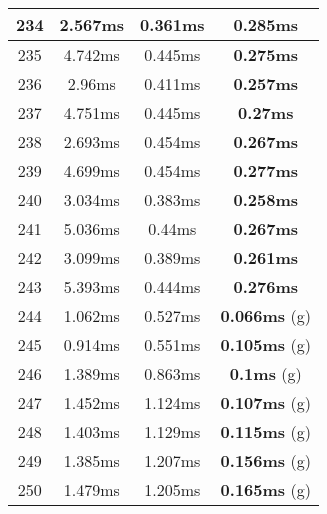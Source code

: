 \begin{table}[H]
\begin{minipage}{5cm}
{\begin{tabular}{|c|c|c|c|}
\hline
234 & 2.567ms & 0.361ms & \textbf{0.285ms} \\
\hline
235 & 4.742ms & 0.445ms & \textbf{0.275ms} \\
\hline
236 & 2.96ms & 0.411ms & \textbf{0.257ms} \\
\hline
237 & 4.751ms & 0.445ms & \textbf{0.27ms} \\
\hline
238 & 2.693ms & 0.454ms & \textbf{0.267ms} \\
\hline
239 & 4.699ms & 0.454ms & \textbf{0.277ms} \\
\hline
240 & 3.034ms & 0.383ms & \textbf{0.258ms} \\
\hline
241 & 5.036ms & 0.44ms & \textbf{0.267ms} \\
\hline
242 & 3.099ms & 0.389ms & \textbf{0.261ms} \\
\hline
243 & 5.393ms & 0.444ms & \textbf{0.276ms} \\
\hline
244 & 1.062ms & 0.527ms & \textbf{0.066ms} (g) \\
\hline
245 & 0.914ms & 0.551ms & \textbf{0.105ms} (g) \\
\hline
246 & 1.389ms & 0.863ms & \textbf{0.1ms} (g) \\
\hline
247 & 1.452ms & 1.124ms & \textbf{0.107ms} (g) \\
\hline
248 & 1.403ms & 1.129ms & \textbf{0.115ms} (g) \\
\hline
249 & 1.385ms & 1.207ms & \textbf{0.156ms} (g) \\
\hline
250 & 1.479ms & 1.205ms & \textbf{0.165ms} (g) \\
\hline
\end{tabular}
}
\end{minipage}
\end{table}

